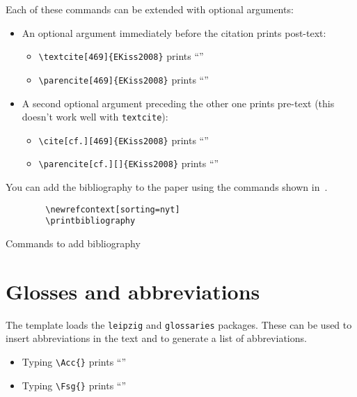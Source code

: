 Each of these commands can be extended with optional arguments:

\begin{itemize}
    \item An optional argument immediately before the citation prints post-text:
    \begin{itemize}
        \item \verb+\textcite[469]{EKiss2008}+ prints \enquote{\textcite[469]{EKiss2008}}
        \item \verb+\parencite[469]{EKiss2008}+ prints \enquote{\parencite[469]{EKiss2008}}
    \end{itemize}
    \item A second optional argument preceding the other one prints pre-text (this doesn't work well with \verb+textcite+):
    \begin{itemize}
        \item \verb+\cite[cf.][469]{EKiss2008}+ prints \enquote{\cite[cf.][469]{EKiss2008}}
        \item \verb+\parencite[cf.][]{EKiss2008}+ prints \enquote{\parencite[cf.][]{EKiss2008}}
    \end{itemize}
\end{itemize}

You can add the bibliography to the paper using the commands shown in~.

\begin{listing}[H]
    \begin{verbatim}
        \newrefcontext[sorting=nyt]
        \printbibliography
    \end{verbatim}
    \caption{Commands to add bibliography}\label{lst:bibliography}
\end{listing}

\section{Glosses and abbreviations}

The template loads the \texttt{leipzig} and \texttt{glossaries} packages. These can
be used to insert abbreviations in the text and to generate a list of abbreviations.

\begin{itemize}
    \item Typing \verb+\Acc{}+ prints \enquote{\Acc}
    \item Typing \verb+\Fsg{}+ prints \enquote{\Fsg}
\end{itemize}

